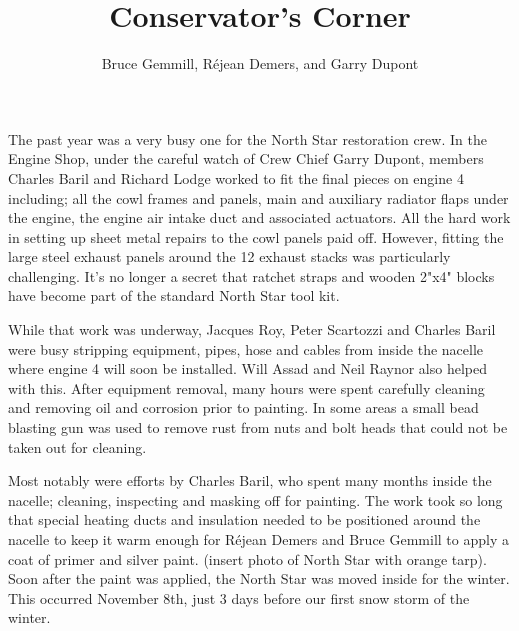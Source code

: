 %


\title{Conservator's Corner}
\author{Bruce Gemmill, R\'{e}jean Demers, and Garry Dupont}

\maketitle


The past year was a very busy one for the North Star restoration crew. 
In the Engine Shop, under the careful watch of Crew Chief Garry Dupont,
members Charles Baril and Richard Lodge worked to fit the final pieces
on engine 4 including; all the cowl frames and panels, main and
auxiliary radiator flaps under the engine, the engine air intake duct
and associated actuators. All the hard work in setting up sheet metal
repairs to the cowl panels paid off.  However, fitting the large steel
exhaust panels around the 12 exhaust stacks was particularly
challenging. It's no longer a secret that ratchet straps and wooden
2"x4" blocks have become part of the standard North Star tool kit.

While that work was underway, Jacques Roy, Peter Scartozzi and Charles
Baril were busy stripping equipment, pipes, hose and cables from inside
the nacelle where engine 4 will soon be installed.  Will Assad and Neil
Raynor also helped with this. After equipment removal, many hours were
spent carefully cleaning and removing oil and corrosion prior to
painting.  In some areas a small bead blasting gun was used to remove
rust from nuts and bolt heads that could not be taken out for cleaning.

Most notably were efforts by Charles Baril, who spent many months
inside the nacelle; cleaning, inspecting and masking off for painting.
The work took so long that special heating ducts and insulation needed
to be positioned around the nacelle to keep it warm enough for Réjean
Demers and Bruce Gemmill to apply a coat of primer and silver paint.
(insert photo of North Star with orange tarp). Soon after the paint was
applied, the North Star was moved inside for the winter. This occurred
November 8th, just 3 days before our first snow storm of the winter.

